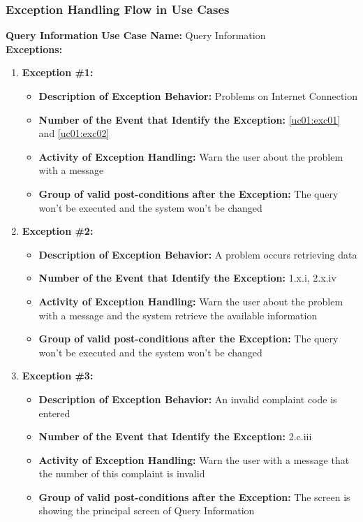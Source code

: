 \documentclass[11pt,twoside]{article}
\begin{document}
\subsubsection{Exception Handling Flow in Use Cases}
\label{sec:ehusecases}
\textbf{Query Information}
\textbf{Use Case Name:} Query Information\\
\textbf{Exceptions:}
\begin{enumerate}
 \item \textbf{Exception \#1:}
 \begin{itemize}
  \item \textbf{Description of Exception Behavior:} Problems on Internet Connection
  \item \textbf{Number of the Event that Identify the Exception:} \ref{uc01:exc01} and \ref{uc01:exc02}
  \item \textbf{Activity of Exception Handling:} Warn the user about the problem with a message
  \item \textbf{Group of valid post-conditions after the Exception:} The query won't be executed and the system won't be changed
 \end{itemize}
 \item \textbf{Exception \#2:}
 \begin{itemize}
  \item \textbf{Description of Exception Behavior:} A problem occurs retrieving data
  \item \textbf{Number of the Event that Identify the Exception:} 1.x.i, 2.x.iv
  \item \textbf{Activity of Exception Handling:} Warn the user about the problem with a message and the system retrieve the available
information
  \item \textbf{Group of valid post-conditions after the Exception:} The query won't be executed and the system won't be changed
 \end{itemize}
 \item \textbf{Exception \#3:}
 \begin{itemize}
  \item \textbf{Description of Exception Behavior:} An invalid complaint code is entered
  \item \textbf{Number of the Event that Identify the Exception:} 2.c.iii
  \item \textbf{Activity of Exception Handling:} Warn the user with a message that the number of this complaint is invalid
  \item \textbf{Group of valid post-conditions after the Exception:} The screen is showing the principal screen of Query Information

\end{itemize}
\end{enumerate}
\end{document}
